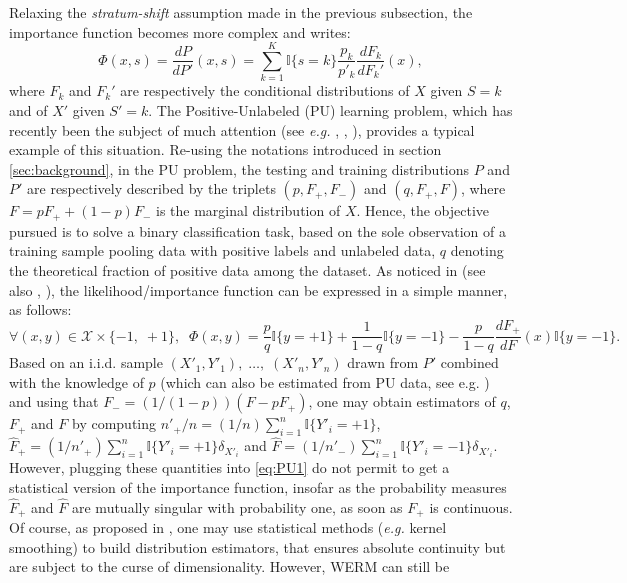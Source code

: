 \documentclass[12pt]{article}
\begin{document}
Relaxing the \textit{stratum-shift} assumption made in the previous subsection, the importance function becomes more complex and writes:
$$
    \Phi(x, s) = \frac{dP}{dP'}(x,s)=
    \sum_{k=1}^K \mathbb{I}\{s=k\} \frac{p_k}{p'_k} \frac{dF_k}{dF_k'}(x),
$$
where $F_k$ and $F_k'$ are respectively the conditional distributions of $X$ given $S=k$ and of $X'$ given $S'=k$.
The Positive-Unlabeled (PU) learning problem, which has recently been the subject of much attention (see \textit{e.g.} \cite{du2014analysis}, \cite{DuPlessis2015}, \cite{kiryo2017positive}), provides a typical example of this situation. Re-using the notations introduced in section \ref{sec:background}, in the PU problem, the testing and training distributions $P$ and $P'$ are respectively described by the triplets $(p,F_+,F_-)$ and $(q,F_+,F)$,
where $F=pF_+ + (1-p)F_-$ is the marginal distribution of $X$. Hence, the objective pursued is to solve a binary classification task, based on the sole observation of a training sample pooling data with positive labels and unlabeled data, $q$ denoting the theoretical fraction of positive data among the dataset.
As noticed in \cite{du2014analysis} (see also \cite{DuPlessis2015}, \cite{kiryo2017positive}), the likelihood/importance function can be expressed in a simple manner, as follows:
\begin{equation}\label{eq:PU1}
\forall (x,y)\in\mathcal{X}\times \{-1,\; +1 \},\;\; \Phi(x,y) = \frac{p}{q}\mathbb{I}\{y=+1 \} + \frac{1}{1-q} \mathbb{I}\{y=-1 \} - \frac{p}{1-q} \frac{dF_+}{dF}(x) \mathbb{I}\{y=-1 \}.
\end{equation}
Based on an i.i.d. sample $(X'_1,Y'_1),\; \ldots,\; (X'_n,Y'_n)$ drawn from
$P'$ combined with the knowledge of $p$ (which can also be estimated from PU data, see e.g. \cite{du2014class}) and using that $F_-=(1/(1-p))(F-pF_+)$,
one may obtain estimators of $q$, $F_+$ and $F$ by computing
$n'_+/n=(1/n)\sum_{i=1}^n\mathbb{I}\{Y'_i=+1 \}$,
$\widehat{F}_+=(1/n'_+)\sum_{i=1}^n\mathbb{I}\{Y'_i=+1\}\delta_{X'_i}$ and
$\widehat{F} =(1/n'_-)\sum_{i=1}^n\mathbb{I}\{Y'_i=-1\}\delta_{X'_i}$. However,
plugging these quantities into \eqref{eq:PU1} do not permit to get a
statistical version of the importance function, insofar as the probability
measures $\widehat{F}_+$ and $\widehat{F}$ are mutually singular with
probability one, as soon as $F_+$ is continuous. Of course, as proposed in
\cite{du2014analysis}, one may use statistical methods (\textit{e.g.} kernel
smoothing) to build distribution estimators, that ensures absolute continuity
but are subject to the curse of dimensionality. However, WERM can still be
\end{document}
